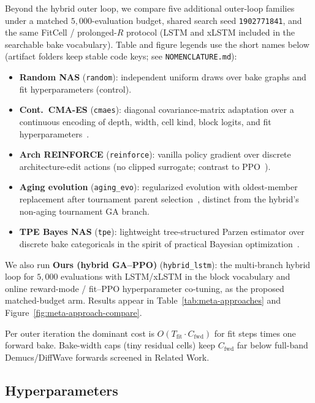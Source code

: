 Beyond the hybrid outer loop, we compare five additional outer-loop families under a matched $5{,}000$-evaluation budget, shared search seed \texttt{1902771841}, and the same FitCell / prolonged-$R$ protocol (LSTM and xLSTM included in the searchable bake vocabulary).
Table and figure legends use the short names below (artifact folders keep stable code keys; see \texttt{NOMENCLATURE.md}):
\begin{itemize}
  \item \textbf{Random NAS} (\texttt{random}): independent uniform draws over bake graphs and fit hyperparameters (control).
  \item \textbf{Cont.\ CMA-ES} (\texttt{cmaes}): diagonal covariance-matrix adaptation over a continuous encoding of depth, width, cell kind, block logits, and fit hyperparameters~\cite{hansen2016cmaes}.
  \item \textbf{Arch REINFORCE} (\texttt{reinforce}): vanilla policy gradient over discrete architecture-edit actions (no clipped surrogate; contrast to PPO~\cite{schulman2017,zoph2017nas}).
  \item \textbf{Aging evolution} (\texttt{aging\_evo}): regularized evolution with oldest-member replacement after tournament parent selection~\cite{real2017large,real2019}, distinct from the hybrid's non-aging tournament GA branch.
  \item \textbf{TPE Bayes NAS} (\texttt{tpe}): lightweight tree-structured Parzen estimator over discrete bake categoricals in the spirit of practical Bayesian optimization~\cite{snoek2012}.
\end{itemize}
We also run \textbf{Ours (hybrid GA--PPO)} (\texttt{hybrid\_lstm}): the multi-branch hybrid loop for $5{,}000$ evaluations with LSTM/xLSTM in the block vocabulary and online reward-mode / fit--PPO hyperparameter co-tuning, as the proposed matched-budget arm.
Results appear in Table~\ref{tab:meta-approaches} and Figure~\ref{fig:meta-approach-compare}.

\begin{remark}
\label{rem:complexity}
Per outer iteration the dominant cost is $O(T_{\mathrm{fit}}\cdot C_{\mathrm{fwd}})$ for fit steps times one forward bake.
Bake-width caps (tiny residual cells) keep $C_{\mathrm{fwd}}$ far below full-band Demucs/DiffWave forwards screened in Related Work.
\end{remark}



\subsection{Hyperparameters}
\label{sec:hyperparams}

